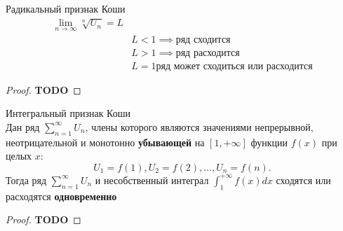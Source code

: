 \begin{priz}
    \label{priz:radcauchy} Радикальный признак Коши \\
    \begin{equation}
        \begin{align*}
            \lim_{n\to\infty}\sqrt[n]{U_{n}} = L \\
            &L < 1\implies \text{ряд сходится}\\
            &L > 1\implies \text{ряд расходится}\\
            &L = 1\text{ряд может сходиться или расходится}
        \end{align*}
    \end{equation}
    \begin{proof}
        \color{YellowOrange}\textbf{TODO}
    \end{proof}
\end{priz}

\begin{priz}
    \label{priz:intcauchy} Интегральный признак Коши \\
    Дан ряд \(\sum_{n=1}^{\infty} U_{n}\), члены которого являются значениями 
    непрерывной, неотрицательной и монотонно \textbf{убывающей} 
    на \([1, +\infty]\) функции \(f(x)\) при целых \(x\):
    \begin{equation}
        U_{1} = f(1), U_{2} = f(2), \dots , U_{n} = f(n).
    \end{equation}
    Тогда ряд \(\sum_{n=1}^{\infty} U_{n}\) 
    и несобственный интеграл \(\int_{1}^{+\infty} f(x)dx \)
    сходятся или расходятся \textbf{одновременно}

    \begin{proof}
        \color{YellowOrange}\textbf{TODO}
    \end{proof}
\end{priz}

